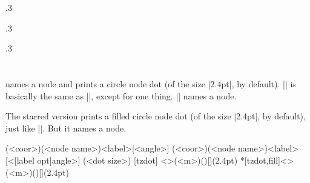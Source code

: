 \begin{tzcode}{.3}
\end{tzcode}


\begin{tzcode}{.3}
\end{tzcode}


\begin{tzcode}{.3}
\end{tzcode}



\section{\protect\cmd{\tznodedot(*)}}
\label{s:tznodedot}

\icmd{\tznodedot} names a node and prints a circle node dot (of the size |2.4pt|, by default).
|\tznodedot| is basically the same as |\tzdot|, except for one thing.
|\tznodedot| names a node.

The starred version \icmd{\tznodedot*} prints a filled circle node dot (of the size |2.4pt|, by default), just like |\tzdot*|. But it  names a node.

\begin{tzdef}{}
\tznodedot(<coor>)(<node name>){<label>}[<angle>]
           (<coor>)(<node name>){<label>}[<[label opt]angle>] (<dot size>)
  [tzdot]     <>(<m>)(){}[](2.4pt)
 *[tzdot,fill]<>(<m>)(){}[](2.4pt)
\end{tzdef}

